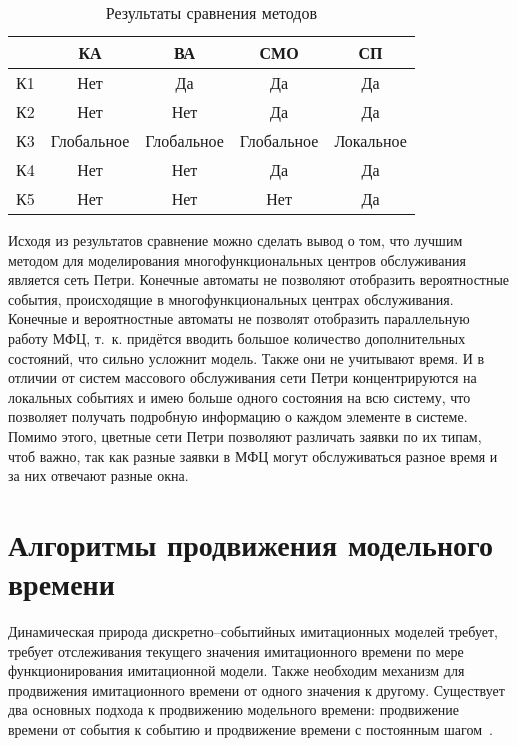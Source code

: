 \begin{table}[!ht]
	\begin{center}
		\begin{threeparttable}
			\captionsetup{justification=raggedright,singlelinecheck=off}
			\caption{Результаты сравнения  методов}
			\label{tbl:cmp}
			\begin{tabular}{|l|c|c|c|c|}
				\hline
				\makecell[c]{Критерий} & КА & ВА & СМО & СП \\\hline
				К1	& Нет & Да &	Да & Да \\\hline
				К2 & Нет & Нет & Да & Да \\\hline
				К3 & Глобальное & Глобальное & Глобальное &	Локальное \\\hline
				К4 & Нет & Нет & Да & Да \\\hline
				К5 & Нет & Нет & Нет & Да \\\hline
			\end{tabular}
		\end{threeparttable}
	\end{center}
\end{table}

Исходя из результатов сравнение можно сделать вывод о том, что лучшим методом для моделирования многофункциональных центров обслуживания является сеть Петри. Конечные автоматы не позволяют отобразить вероятностные события, происходящие в многофункциональных центрах обслуживания. Конечные и вероятностные автоматы не позволят отобразить параллельную работу МФЦ, т.~к. придётся вводить большое количество дополнительных состояний, что сильно усложнит модель. Также они не учитывают время. И в отличии от систем массового обслуживания сети Петри концентрируются на локальных событиях и имею больше одного состояния на всю систему, что позволяет получать подробную информацию о каждом элементе в системе. Помимо этого, цветные сети Петри позволяют различать заявки по их типам, чтоб важно, так как разные заявки в МФЦ могут обслуживаться разное время и за них отвечают разные окна.


\section{Алгоритмы продвижения модельного времени}

Динамическая природа дискретно--событийных имитационных моделей требует, требует отслеживания текущего значения имитационного времени по мере функционирования имитационной модели. Также необходим механизм для продвижения имитационного времени от одного значения к другому. Существует два основных подхода к продвижению модельного времени: продвижение времени от события к событию и продвижение времени с постоянным
шагом~\cite{time_alg}.

